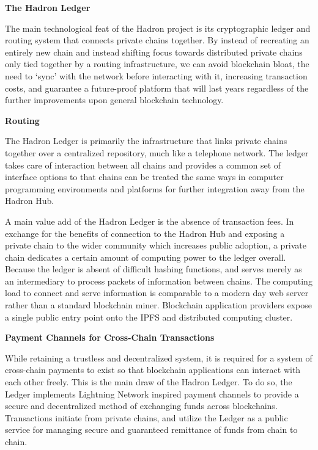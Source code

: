 \documentclass{article}
\begin{document}
\begin{center}
\textbf{The Hadron Ledger}
\end{center}

The main technological feat of the Hadron project is its cryptographic ledger and routing system that connects private chains together. By instead of recreating an entirely new chain and instead shifting focus towards distributed private chains only tied together by a routing infrastructure, we can avoid blockchain bloat, the need to ‘sync’ with the network before interacting with it, increasing transaction costs, and guarantee a future-proof platform that will last years regardless of the further improvements upon general blockchain technology.

\begin{center}
\textbf{Routing}
\end{center}

The Hadron Ledger is primarily the infrastructure that links private chains together over a centralized repository, much like a telephone network. The ledger takes care of interaction between all chains and provides a common set of interface options to that chains can be treated the same ways in computer programming environments and platforms for further integration away from the Hadron Hub.

A main value add of the Hadron Ledger is the absence of transaction fees. In exchange for the benefits of connection to the Hadron Hub and exposing a private chain to the wider community which increases public adoption, a private chain dedicates a certain amount of computing power to the ledger overall. Because the ledger is absent of difficult hashing functions, and serves merely as an intermediary to process packets of information between chains. The computing load to connect and serve information is comparable to a modern day web server rather than a standard blockchain miner. Blockchain application providers expose a single public entry point onto the IPFS and distributed computing cluster.

\begin{center}
\textbf{Payment Channels for Cross-Chain Transactions}
\end{center}

While retaining a trustless and decentralized system, it is required for a system of cross-chain payments to exist so that blockchain applications can interact with each other freely. This is the main draw of the Hadron Ledger. To do so, the Ledger implements Lightning Network inspired payment channels to provide a secure and decentralized method of exchanging funds across blockchains. Transactions initiate from private chains, and utilize the Ledger as a public service for managing secure and guaranteed remittance of funds from chain to chain.
\end{document}
